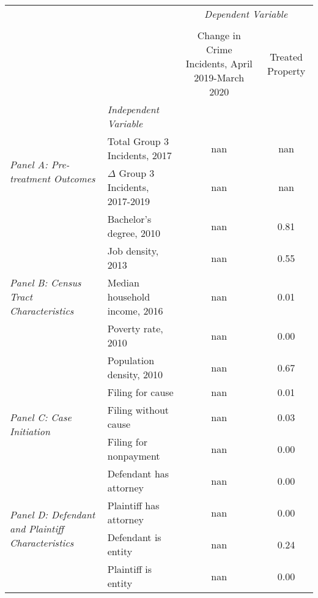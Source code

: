\begin{tabular}{llcc}
\toprule
 &  & \multicolumn{2}{c}{\textit{Dependent Variable}} \\
\cline{3-4}
\\
 &  & Change in Crime Incidents, April 2019-March 2020 & Treated Property \\
 & \emph{Independent Variable} &  &  \\
\midrule
\multirow[c]{2}{3cm}{\textit{Panel A: Pre-treatment Outcomes}} & Total Group 3 Incidents, 2017 & nan & nan \\
 & $\Delta$ Group 3 Incidents, 2017-2019 & nan & nan \\
\cline{1-4}
\multirow[c]{5}{3cm}{\textit{Panel B: Census Tract Characteristics}} & Bachelor's degree, 2010 & nan & 0.81 \\
 & Job density, 2013 & nan & 0.55 \\
 & Median household income, 2016 & nan & 0.01 \\
 & Poverty rate, 2010 & nan & 0.00 \\
 & Population density, 2010 & nan & 0.67 \\
\cline{1-4}
\multirow[c]{3}{3cm}{\textit{Panel C: Case Initiation}} & Filing for cause & nan & 0.01 \\
 & Filing without cause & nan & 0.03 \\
 & Filing for nonpayment & nan & 0.00 \\
\cline{1-4}
\multirow[c]{4}{3cm}{\textit{Panel D: Defendant and Plaintiff Characteristics}} & Defendant has attorney & nan & 0.00 \\
 & Plaintiff has attorney & nan & 0.00 \\
 & Defendant is entity & nan & 0.24 \\
 & Plaintiff is entity & nan & 0.00 \\
\cline{1-4}
\bottomrule
\end{tabular}

